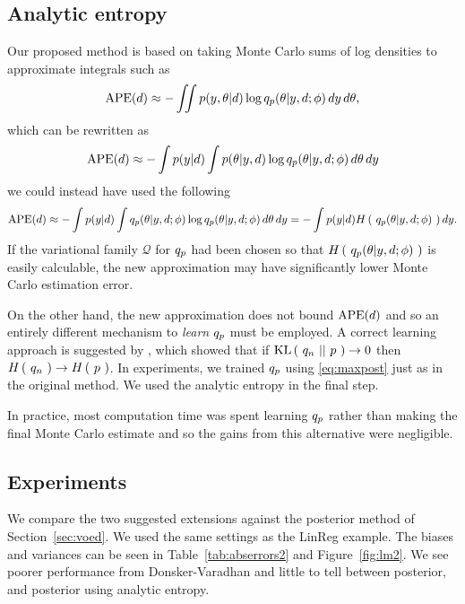 \subsection{Analytic entropy}
Our proposed method is based on taking Monte Carlo sums of log densities to approximate integrals such as
\begin{equation}
	\label{eq:crossentropyest}
	\text{APE}(d) \approx -\iint p(y, \theta | d) \log q_p (\theta | y, d; \phi)\, dy\, d\theta,
\end{equation}
which can be rewritten as
\begin{equation}
	\text{APE}(d) \approx -\int p(y|d) \int p(\theta | y, d) \log q_p (\theta | y, d; \phi)\, d\theta\, dy
\end{equation}
we could instead have used the following
\begin{equation}
	\text{APE}(d) \approx -\int p(y|d) \int q_p (\theta | y, d; \phi) \log q_p (\theta | y, d; \phi)\, d\theta\, dy = -\int p(y|d) H\left(\ q_p (\theta | y, d; \phi)\ \right) dy.
\end{equation}
If the variational family $\mathcal{Q}$ for $q_p$ had been chosen so that $H\left(\ q_p (\theta | y, d; \phi)\ \right)$ is easily calculable, the new approximation may have significantly lower Monte Carlo estimation error.

On the other hand, the new approximation does not bound $\text{APE}(d)$ and so an entirely different mechanism to \textit{learn} $q_p$ must be employed. A correct learning approach is suggested by \cite{piera2009}, which showed that if $\text{KL}\left(\ q_n\ ||\ p\ \right) \to 0$ then $H\left(\ q_n\ \right) \to H\left(\ p\ \right)$. In experiments, we trained $q_p$ using \eqref{eq:maxpost} just as in the original method. We used the analytic entropy in the final step.

In practice, most computation time was spent learning $q_p$ rather than making the final Monte Carlo estimate and so the gains from this alternative were negligible. 


\subsection{Experiments}
We compare the two suggested extensions against the posterior method of Section~\ref{sec:voed}. We used the same settings as the LinReg example. The biases and variances can be seen in Table~\ref{tab:abserrors2} and Figure~\ref{fig:lm2}. We see poorer performance from Donsker-Varadhan and little to tell between posterior, and posterior using analytic entropy.

